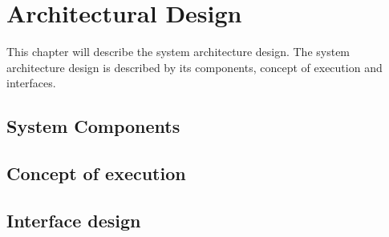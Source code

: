 
\thispagestyle{fancy}
\chapter{Architectural Design}
\label{chp:architectural}

This chapter will describe the system architecture design.
The system architecture design is described by its components, concept of execution and interfaces.

\section{System Components}

\section{Concept of execution}
\label{sec:concept_execution}

\section{Interface design}
\label{sec:arch_interface}

